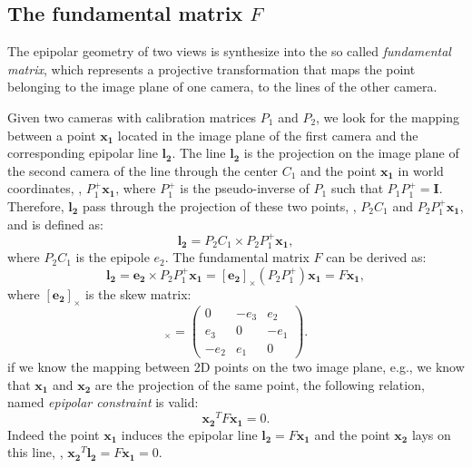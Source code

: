 \subsection{The fundamental matrix \texorpdfstring{$F$}{F}}
The epipolar geometry of two views is synthesize into the so called \emph{fundamental matrix}, which represents a projective transformation that maps the point belonging to the image plane of one camera, to the lines of the other camera.

Given two cameras with calibration matrices $P_1$ and $P_2$, we look for the mapping between a point $\mathbf{x_1}$ located in the image plane of the first camera and the corresponding epipolar line $\mathbf{l_2}$. 
The line $\mathbf{l_2}$ is the projection on the image plane of the second camera of the line through the center $C_1$ and the point $\mathbf{x_1}$ in world coordinates, \ie, $P_1^+\mathbf{x_1}$, where $P_1^+$ is the pseudo-inverse of $P_1$ such that $P_1P_1^+ = \mathbf{I}$.
Therefore, $\mathbf{l_2}$ pass through the projection of these two points, \ie, $P_2C_1$ and $P_2P_1^+\mathbf{x_1}$, and is defined as:
\begin{equation}
 \mathbf{l_2} =  P_2C_1 \times P_2P_1^+\mathbf{x_1},
\end{equation}
where $P_2C_1$ is the epipole $e_2$. The fundamental matrix $F$ can be derived as:
\begin{equation}
 \mathbf{l_2} =  \mathbf{e_2} \times P_2P_1^+\mathbf{x_1} = [\mathbf{e_2}]_{\times} (P_2P_1^+)\mathbf{x_1} = F \mathbf{x_1},
\end{equation}
where $[\mathbf{e_2}]_{\times}$ is the skew matrix:
\begin{equation}
  [e]_{\times} =
  \begin{pmatrix}
    0   & -e_3 & e_2\\
    e_3 &   0  & -e_1\\
   -e_2 &  e_1 & 0
  \end{pmatrix}.
\end{equation}
if we know the mapping between 2D points on the two image plane, e.g., we know that $\mathbf{x_1}$ and $\mathbf{x_2}$ are the projection of the same point, the following relation, named \emph{epipolar constraint} is valid:
\begin{equation}
  \mathbf{x_2}^{T} F \mathbf{x_1} = 0.
\end{equation}
Indeed the point  $\mathbf{x_1}$ induces the epipolar line $\mathbf{l_2} = F \mathbf{x_1}$ and the point $\mathbf{x_2}$ lays on this line, \ie, $\mathbf{x_2}^{T} \mathbf{l_2} =  F \mathbf{x_1} = 0$.

